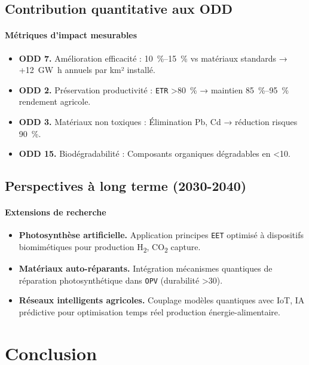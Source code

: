 \documentclass[12pt, a4paper]{article}
\begin{document}
\subsection{Contribution quantitative aux ODD}

\paragraph{Métriques d'impact mesurables}
\begin{itemize}
    \item \textbf{ODD 7.} Amélioration efficacité : \SIrange{+10}{+15}{\percent} vs matériaux standards → +\SI{12}{\giga\watt\hour} annuels par km² installé.
    \item \textbf{ODD 2.} Préservation productivité : \texttt{ETR} \SI{>80}{\percent} → maintien \SIrange{85}{95}{\percent} rendement agricole.
    \item \textbf{ODD 3.} Matériaux non toxiques : Élimination Pb, Cd → réduction risques \SI{90}{\percent}.
    \item \textbf{ODD 15.} Biodégradabilité : Composants organiques dégradables en \SI{<10}{\year}.
\end{itemize}

\subsection{Perspectives à long terme (2030-2040)}

\paragraph{Extensions de recherche}
\begin{itemize}
    \item \textbf{Photosynthèse artificielle.} Application principes \texttt{EET} optimisé à dispositifs biomimétiques pour production H\textsubscript{2}, CO\textsubscript{2} capture.
    \item \textbf{Matériaux auto-réparants.} Intégration mécanismes quantiques de réparation photosynthétique dans \texttt{OPV} (durabilité \SI{>30}{\year}).
    \item \textbf{Réseaux intelligents agricoles.} Couplage modèles quantiques avec IoT, IA prédictive pour optimisation temps réel production énergie-alimentaire.
\end{itemize}

\section*{Conclusion}
\end{document}
